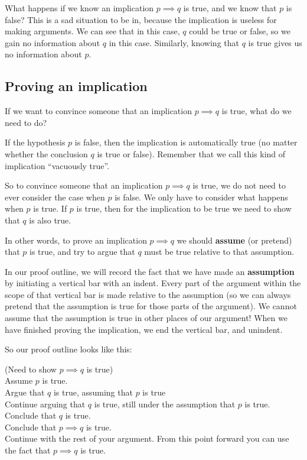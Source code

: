 What happens if we know an implication $p \implies q$ is true, and we know that $p$ is false?  This is a sad situation to be in, because the implication is useless for making arguments.  We can see that in this case, $q$ could be true or false, so we gain no information about $q$ in this case.  Similarly, knowing that $q$ is true gives us no information about $p$.

\subsection{Proving an implication}

If we want to convince someone that an implication $p \implies q$ is true, what do we need to do?

If the hypothesis $p$ is false, then the implication is automatically true (no matter whether the conclusion $q$ is true or false).  Remember that we call this kind of implication ``vacuously true''.  

So to convince someone that an implication $p \implies q$ is true, we do not need to ever consider the case when $p$ is false.  We only have to consider what happens when $p$ is true.  If $p$ is true, then for the implication to be true we need to show that $q$ is also true.

In other words, to prove an implication $p \implies q$ we should \textbf{assume} (or pretend) that $p$ is true, and try to argue that $q$ must be true relative to that assumption.

In our proof outline, we will record the fact that we have made an \textbf{assumption} by initiating a vertical bar with an indent.  Every part of the argument within the scope of that vertical bar is made relative to the assumption (so we can always pretend that the assumption is true for those parts of the argument).  We cannot assume that the assumption is true in other places of our argument!  When we have finished proving the implication, we end the vertical bar, and unindent.

 
\newpage

So our proof outline looks like this:


	\begin{fitch*}
		\textrm{(Need to show $p \implies q$ is true)}\\
		\textrm{Assume $p$ is true.}\\
		\fa \textrm{ Argue that $q$ is true, assuming that $p$ is true}\\
		\fa \textrm{ Continue arguing that $q$ is true, still under the assumption that $p$ is true.}\\
		\fa \textrm{ Conclude that $q$ is true.}\\
		\textrm{Conclude that $p \implies q$ is true.}\\
		\textrm{Continue with the rest of your argument.  From this point forward you can use the fact that $p \implies q$ is true.}\\
	\end{fitch*}

